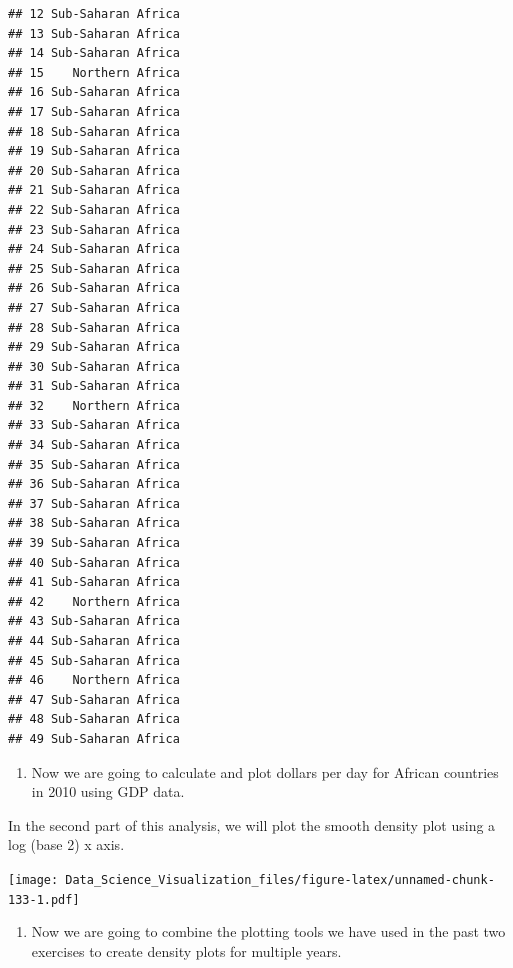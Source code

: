 \documentclass[
]{article}
\newenvironment{Shaded}{\begin{snugshade}}{\end{snugshade}}
\newcommand{\DataTypeTok}[1]{\textcolor[rgb]{0.13,0.29,0.53}{#1}}
\newcommand{\KeywordTok}[1]{\textcolor[rgb]{0.13,0.29,0.53}{\textbf{#1}}}
\newcommand{\NormalTok}[1]{#1}
\newcommand{\OperatorTok}[1]{\textcolor[rgb]{0.81,0.36,0.00}{\textbf{#1}}}
\newcommand{\StringTok}[1]{\textcolor[rgb]{0.31,0.60,0.02}{#1}}
\providecommand{\tightlist}{%
  \setlength{\itemsep}{0pt}\setlength{\parskip}{0pt}}
\begin{document}
\begin{verbatim}
## 12 Sub-Saharan Africa
## 13 Sub-Saharan Africa
## 14 Sub-Saharan Africa
## 15    Northern Africa
## 16 Sub-Saharan Africa
## 17 Sub-Saharan Africa
## 18 Sub-Saharan Africa
## 19 Sub-Saharan Africa
## 20 Sub-Saharan Africa
## 21 Sub-Saharan Africa
## 22 Sub-Saharan Africa
## 23 Sub-Saharan Africa
## 24 Sub-Saharan Africa
## 25 Sub-Saharan Africa
## 26 Sub-Saharan Africa
## 27 Sub-Saharan Africa
## 28 Sub-Saharan Africa
## 29 Sub-Saharan Africa
## 30 Sub-Saharan Africa
## 31 Sub-Saharan Africa
## 32    Northern Africa
## 33 Sub-Saharan Africa
## 34 Sub-Saharan Africa
## 35 Sub-Saharan Africa
## 36 Sub-Saharan Africa
## 37 Sub-Saharan Africa
## 38 Sub-Saharan Africa
## 39 Sub-Saharan Africa
## 40 Sub-Saharan Africa
## 41 Sub-Saharan Africa
## 42    Northern Africa
## 43 Sub-Saharan Africa
## 44 Sub-Saharan Africa
## 45 Sub-Saharan Africa
## 46    Northern Africa
## 47 Sub-Saharan Africa
## 48 Sub-Saharan Africa
## 49 Sub-Saharan Africa
\end{verbatim}

\begin{enumerate}
\def\labelenumi{\arabic{enumi}.}
\setcounter{enumi}{7}
\tightlist
\item
  Now we are going to calculate and plot dollars per day for African
  countries in 2010 using GDP data.
\end{enumerate}

In the second part of this analysis, we will plot the smooth density
plot using a log (base 2) x axis.

\begin{Shaded}
\end{Shaded}

\texttt{[image: Data\_Science\_Visualization\_files/figure-latex/unnamed-chunk-133-1.pdf]}

\begin{enumerate}
\def\labelenumi{\arabic{enumi}.}
\setcounter{enumi}{8}
\tightlist
\item
  Now we are going to combine the plotting tools we have used in the
  past two exercises to create density plots for multiple years.
\end{enumerate}
\end{document}
